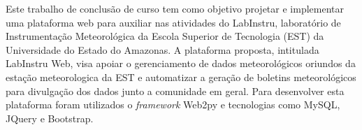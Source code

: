 Este trabalho de conclus\~{a}o de curso tem como objetivo projetar e implementar uma plataforma web para auxiliar nas atividades do LabInstru, laborat\'orio de Instrumenta\c{c}\~{a}o Meteorol\'ogica da Escola Superior de Tecnologia (EST) da Universidade do Estado do Amazonas. A plataforma proposta, intitulada LabInstru Web, visa apoiar o gerenciamento de dados meteorol\'ogicos oriundos da esta\c{c}\~{a}o meteorologica da EST e automatizar a gera\c{c}\~{a}o de boletins meteorol\'ogicos para divulga\c{c}\~{a}o dos dados junto a comunidade em geral. Para desenvolver esta plataforma foram utilizados o \emph{framework} Web2py e tecnologias como MySQL, JQuery e Bootstrap.